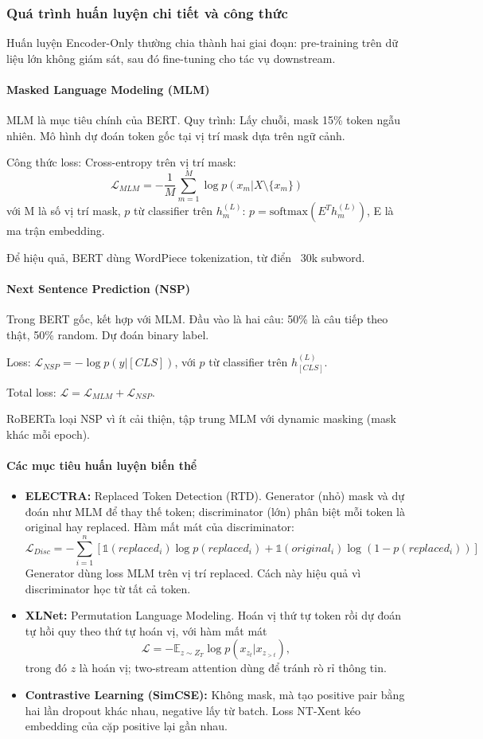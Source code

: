 \subsubsection{Quá trình huấn luyện chi tiết và công thức}
Huấn luyện Encoder-Only thường chia thành hai giai đoạn: pre-training trên dữ liệu lớn không giám sát, sau đó fine-tuning cho tác vụ downstream.

\paragraph{Masked Language Modeling (MLM)}
MLM là mục tiêu chính của BERT. Quy trình: Lấy chuỗi, mask 15\% token ngẫu nhiên. Mô hình dự đoán token gốc tại vị trí mask dựa trên ngữ cảnh.

Công thức loss: Cross-entropy trên vị trí mask:
\[
\mathcal{L}_{MLM} = -\frac{1}{M} \sum_{m=1}^M \log p(x_m | X \setminus \{x_m\})
\]
với M là số vị trí mask, $p$ từ classifier trên $h_m^{(L)}$: $p = \text{softmax}(E^T h_m^{(L)})$, E là ma trận embedding.

Để hiệu quả, BERT dùng WordPiece tokenization, từ điển ~30k subword.

\paragraph{Next Sentence Prediction (NSP)}
Trong BERT gốc, kết hợp với MLM. Đầu vào là hai câu: 50\% là câu tiếp theo thật, 50\% random. Dự đoán binary label.

Loss: $\mathcal{L}_{NSP} = -\log p(y | [CLS])$, với $p$ từ classifier trên $h_{[CLS]}^{(L)}$.

Total loss: $\mathcal{L} = \mathcal{L}_{MLM} + \mathcal{L}_{NSP}$.

RoBERTa loại NSP vì ít cải thiện, tập trung MLM với dynamic masking (mask khác mỗi epoch).

\paragraph{Các mục tiêu huấn luyện biến thể}
\begin{itemize}
	\item \textbf{ELECTRA:} Replaced Token Detection (RTD). Generator (nhỏ) mask và dự đoán như MLM để thay thế token; discriminator (lớn) phân biệt mỗi token là original hay replaced. Hàm mất mát của discriminator:
	\[
	\mathcal{L}_{Disc} = -\sum_{i=1}^n [ \mathbb{1}(replaced_i) \log p(replaced_i) + \mathbb{1}(original_i) \log (1 - p(replaced_i)) ]
	\]
	Generator dùng loss MLM trên vị trí replaced. Cách này hiệu quả vì discriminator học từ tất cả token.
	\item \textbf{XLNet:} Permutation Language Modeling. Hoán vị thứ tự token rồi dự đoán tự hồi quy theo thứ tự hoán vị, với hàm mất mát
	\[
	\mathcal{L} = -\mathbb{E}_{z \sim Z_T} \log p(x_{z_t} | x_{z_{>t}} ),
	\]
	trong đó $z$ là hoán vị; two-stream attention dùng để tránh rò rỉ thông tin.
	\item \textbf{Contrastive Learning (SimCSE):} Không mask, mà tạo positive pair bằng hai lần dropout khác nhau, negative lấy từ batch. Loss NT-Xent kéo embedding của cặp positive lại gần nhau.
\end{itemize}

